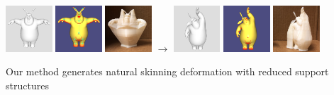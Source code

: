 \documentclass[sigconf]{acmart}
\begin{document}

\begin{teaserfigure}
    \centering
    \includegraphics[width=0.13\textwidth]{bb_bunny.png} 
    \includegraphics[width=0.13\textwidth]{bb_bunny_igl.png} 
    \includegraphics[width=0.13\textwidth]{bb_bunny_3dp.png}
    \quad
    {\LARGE$\rightarrow$}
    \quad
    \includegraphics[width=0.13\textwidth]{bb_bunny_deformed.png} 
    \includegraphics[width=0.13\textwidth]{bb_bunny_deformed_igl.png} 
    \includegraphics[width=0.13\textwidth]{bb_bunny_deformed_3dp.png}
    \caption{Our method generates natural skinning deformation with reduced support structures}
    \label{fig:bb_bunny}
\end{teaserfigure}

\maketitle



\newpage



\end{document}
